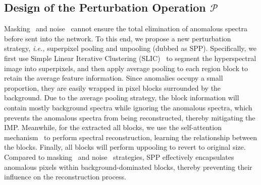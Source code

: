 \subsection{Design of the Perturbation Operation $\mathcal{P}$}


Masking~\cite{SMCNet,AETNet,BS3LNet,BockNet,PDBSNet,DirectNet} and noise~\cite{AutoAD,BSDM} cannot ensure the total elimination of anomalous spectra before sent into the network. To this end, we propose a new perturbation strategy, \textit{i.e.,} superpixel pooling and unpooling (dubbed as SPP). Specifically, we first use Simple Linear Iterative Clustering (SLIC)~\cite{SLIC} to segment the hyperspectral image into superpixels, and then apply average pooling to each region block to retain the average feature information. Since anomalies occupy a small proportion, they are easily wrapped in pixel blocks surrounded by the background. Due to the average pooling strategy, the block information will contain mostly background spectra while ignoring the anomalous spectra, which prevents the anomalous spectra from being reconstructed, thereby mitigating the IMP. Meanwhile, for the extracted all blocks, we use the self-attention mechanism~\cite{vaswani2017attention,ViT} to perform spectral reconstruction, learning the relationship between the blocks. Finally, all blocks will perform uppooling to revert to original size. Compared to masking~\cite{SMCNet,AETNet,BS3LNet,BockNet,PDBSNet,DirectNet} and noise~\cite{AutoAD,BSDM} strategies, SPP effectively encapsulates anomalous pixels within background-dominated blocks, thereby preventing their influence on the reconstruction process.



